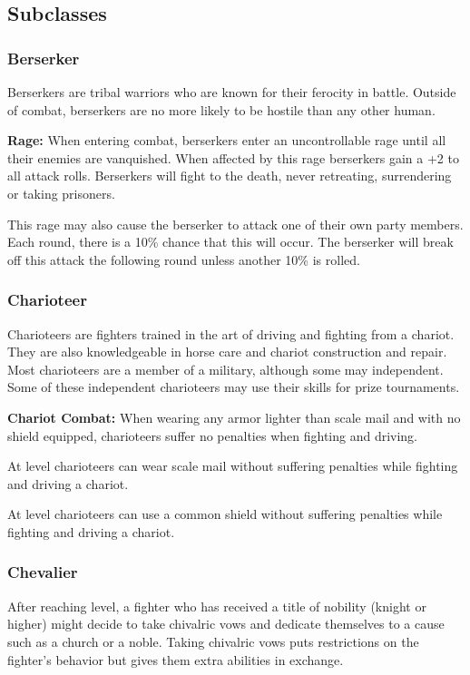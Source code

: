 \begin{multicols*}{2}

\subsection{Subclasses}
\subsubsection{Berserker}
Berserkers are tribal warriors who are known for their ferocity in battle. Outside of combat, berserkers are no more likely to be hostile than any other human.

\textbf{Rage:} When entering combat, berserkers enter an uncontrollable rage until all their enemies are vanquished. When affected by this rage berserkers gain a +2 to all attack rolls. Berserkers will fight to the death, never retreating, surrendering or taking prisoners.

This rage may also cause the berserker to attack one of their own party members. Each round, there is a 10\% chance that this will occur. The berserker will break off this attack the following round unless another 10\% is rolled.

\subsubsection{Charioteer}
Charioteers are fighters trained in the art of driving and fighting from a chariot. They are also knowledgeable in horse care and chariot construction and repair. Most charioteers are a member of a military, although some may independent. Some of these independent charioteers may use their skills for prize tournaments.

\textbf{Chariot Combat:} When wearing any armor lighter than scale mail and with no shield equipped, charioteers suffer no penalties when fighting and driving.

At  level charioteers can wear scale mail without suffering penalties while fighting and driving a chariot.

At  level charioteers can use a common shield without suffering penalties while fighting and driving a chariot.

\subsubsection{Chevalier}
After reaching  level, a fighter who has received a title of nobility (knight or higher) might decide to take chivalric vows and dedicate themselves to a cause such as a church or a noble. Taking chivalric vows puts restrictions on the fighter’s behavior but gives them extra abilities in exchange.


\end{multicols*}
